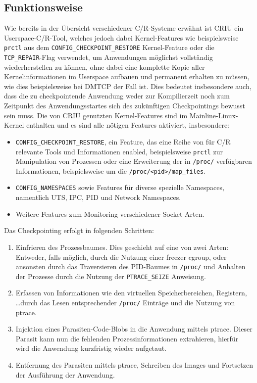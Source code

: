 \documentclass[a4paper]{article}
\begin{document}
\subsection{Funktionsweise}
Wie bereits in der Übersicht verschiedener C/R-Systeme erwähnt ist CRIU ein Userspace-C/R-Tool, welches jedoch dabei Kernel-Features wie beispielsweise \texttt{prctl} aus dem \texttt{CONFIG\_CHECKPOINT\_RESTORE} Kernel-Feature oder die \texttt{TCP\_REPAIR}-Flag\cite{tcpcr} verwendet, um Anwendungen möglichst vollständig wiederherstellen zu können, ohne dabei eine komplette Kopie aller Kernelinformationen im Userspace aufbauen und permanent erhalten zu müssen, wie dies beispielsweise bei DMTCP der Fall ist. 
Dies bedeutet insbesondere auch, dass die zu checkpointende Anwendung weder zur Kompilierzeit noch zum Zeitpunkt des Anwendungsstartes sich des zukünftigen Checkpointings bewusst sein muss.
Die von CRIU genutzten Kernel-Features sind im Mainline-Linux-Kernel enthalten und es sind alle nötigen Features aktiviert, insbesondere:
\begin{itemize}
    \item \texttt{CONFIG\_CHECKPOINT\_RESTORE}, ein Feature, das eine Reihe von für C/R relevante Tools und Informationen enabled, beispielsweise \texttt{prctl} zur Manipulation von Prozessen oder eine Erweiterung der in \texttt{/proc/} verfügbaren Informationen, beispielsweise um die \texttt{/proc/<pid>/map\_files}. 
    \item \texttt{CONFIG\_NAMESPACES} sowie Features für diverse spezielle Namespaces, namentlich UTS, IPC, PID und Network Namespaces.
    \item Weitere Features zum Monitoring verschiedener Socket-Arten.
\end{itemize}
Das Checkpointing erfolgt in folgenden Schritten:
\begin{enumerate}
    \item Einfrieren des Prozessbaumes. Dies geschieht auf eine von zwei Arten: Entweder, falls möglich, durch die Nutzung einer freezer cgroup, oder ansonsten durch das Traversieren des PID-Baumes in \texttt{/proc/} und Anhalten der Prozesse durch die Nutzung der \texttt{PTRACE\_SEIZE} Anweisung.
    \item Erfassen von Informationen wie den virtuellen Speicherbereichen, Registern, \dots durch das Lesen entsprechender \texttt{/proc/} Einträge und die Nutzung von ptrace.
    \item Injektion eines Parasiten-Code-Blobs in die Anwendung mittels ptrace. Dieser Parasit kann nun die fehlenden Prozessinformationen extrahieren, hierfür wird die Anwendung kurzfristig wieder aufgetaut.
    \item Entfernung des Parasiten mittels ptrace, Schreiben des Images und Fortsetzen der Ausführung der Anwendung.
\end{enumerate}
\end{document}
